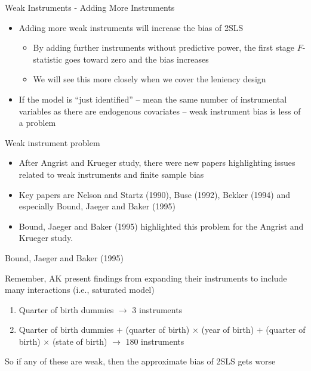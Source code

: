 \documentclass{beamer}
\begin{document}
\begin{frame}{Weak Instruments - Adding More Instruments}
	
	\begin{itemize}
	\item Adding more weak instruments will increase the bias of 2SLS
		\begin{itemize}
		\item By adding further instruments without predictive power, the first stage $F$-statistic goes toward zero and the bias increases
		\item We will see this more closely when we cover the leniency design
		\end{itemize}
	\item If the model is ``just identified'' -- mean the same number of instrumental variables as there are endogenous covariates -- weak instrument bias is less of a problem
	\end{itemize}
\end{frame}

\begin{frame}{Weak instrument problem}

\begin{itemize}
	\item After Angrist and Krueger study, there were new papers highlighting issues related to weak instruments and finite sample bias
	\item Key papers are Nelson and Startz (1990), Buse (1992), Bekker (1994) and especially Bound, Jaeger and Baker (1995)
	\item Bound, Jaeger and Baker (1995) highlighted this problem for the Angrist and Krueger study.  
\end{itemize}

\end{frame}

\begin{frame}{Bound, Jaeger and Baker (1995)}

Remember, AK present findings from expanding their instruments to include many interactions (i.e., saturated model)
		\begin{enumerate}
		\item Quarter of birth dummies $\rightarrow$ 3 instruments
		\item Quarter of birth dummies $+$ (quarter of birth) $\times$ (year of birth) $+$ (quarter of birth) $\times$ (state of birth) $\rightarrow$ 180 instruments
		\end{enumerate}
So if any of these are weak, then the approximate bias of 2SLS gets worse

\end{frame}
\end{document}
